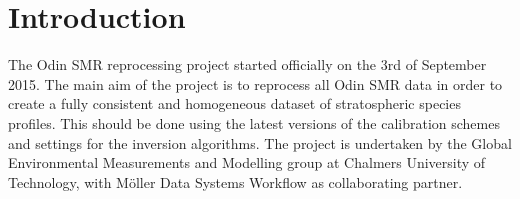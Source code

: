 \chapter{Introduction}
\label{chapter:introduction}

\setcounter{page}{1}


The Odin SMR reprocessing project started officially on the 3rd of September 2015. The main aim of the project is to reprocess all Odin SMR data in order to create a fully consistent and homogeneous dataset of stratospheric species profiles. This should be done using the latest versions of the calibration schemes and settings for the inversion algorithms. The project is undertaken by the Global Environmental Measurements and Modelling group at Chalmers University of Technology, with M\"oller Data Systems Workflow as collaborating partner.   
